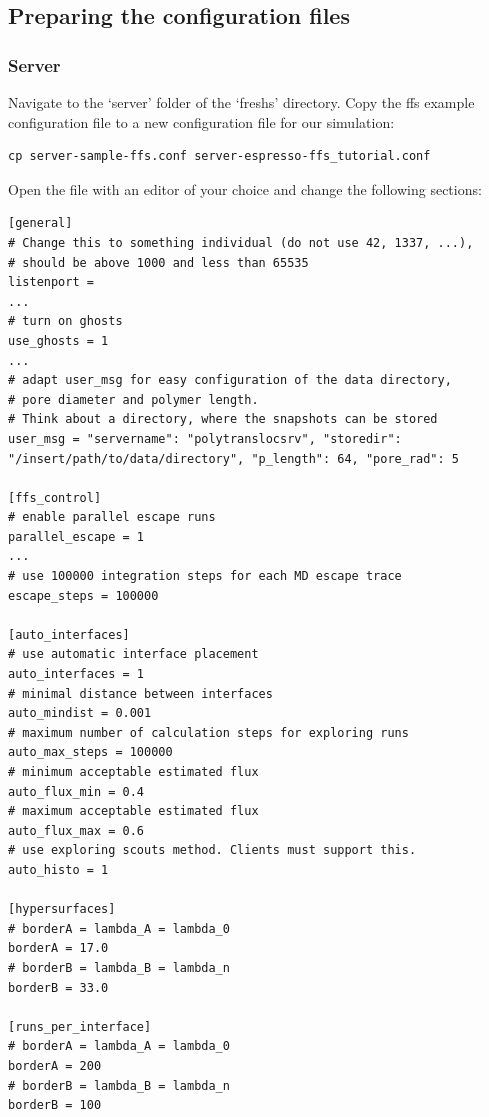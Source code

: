 \documentclass[a4paper,oneside]{article}
\newenvironment{mylisting}
{\begin{list}{}{\setlength{\leftmargin}{1em}}\item\scriptsize\bfseries}
{\end{list}}
\begin{document}
\subsection{Preparing the configuration files}\label{sec:configfiles}
\subsubsection{Server}
Navigate to the `server' folder of the `freshs' directory. Copy the ffs example configuration file to a new configuration file for our simulation:
\begin{mylisting}
\begin{verbatim}
cp server-sample-ffs.conf server-espresso-ffs_tutorial.conf
\end{verbatim}
\end{mylisting}
Open the file with an editor of your choice and change the following sections:
\begin{mylisting}
\begin{verbatim}
[general]
# Change this to something individual (do not use 42, 1337, ...), 
# should be above 1000 and less than 65535
listenport = 
...
# turn on ghosts
use_ghosts = 1
...
# adapt user_msg for easy configuration of the data directory, 
# pore diameter and polymer length.
# Think about a directory, where the snapshots can be stored
user_msg = "servername": "polytranslocsrv", "storedir": 
"/insert/path/to/data/directory", "p_length": 64, "pore_rad": 5

[ffs_control]
# enable parallel escape runs
parallel_escape = 1
...
# use 100000 integration steps for each MD escape trace
escape_steps = 100000

[auto_interfaces]
# use automatic interface placement
auto_interfaces = 1
# minimal distance between interfaces
auto_mindist = 0.001
# maximum number of calculation steps for exploring runs
auto_max_steps = 100000
# minimum acceptable estimated flux
auto_flux_min = 0.4
# maximum acceptable estimated flux
auto_flux_max = 0.6
# use exploring scouts method. Clients must support this.
auto_histo = 1

[hypersurfaces]
# borderA = lambda_A = lambda_0
borderA = 17.0
# borderB = lambda_B = lambda_n
borderB = 33.0

[runs_per_interface]
# borderA = lambda_A = lambda_0
borderA = 200
# borderB = lambda_B = lambda_n
borderB = 100
\end{verbatim}
\end{mylisting}
\end{document}
